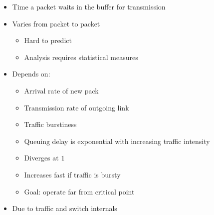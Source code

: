 \begin{itemize}
\begin{itemize}
\begin{itemize}
                        \begin{itemize}
                            \item Time a packet waits in the buffer for transmission
                            \item Varies from packet to packet
                                \begin{itemize}
                                    \item Hard to predict
                                    \item Analysis requires statistical measures
                                \end{itemize}
                            \item Depends on:
                                \begin{itemize}
                                    \item Arrival rate of new pack
                                    \item Transmission rate of outgoing link
                                    \item Traffic burstiness
                                \end{itemize}
                                \begin{itemize}
                                     average packet arrival rate
                                     transmission rate on outgoing link
                                     fixed packet length
                                     average bits arrival rate
                                     traffic intensity
                                    \item Queuing delay is exponential with increasing traffic intensity
                                    \item Diverges at $1$
                                    \item Increases fast if traffic is bursty
                                    \item Goal: operate far from critical point
                                \end{itemize}
                            \item Due to traffic and switch internals
                        \end{itemize}

\end{itemize}
\end{itemize}
\end{itemize}
